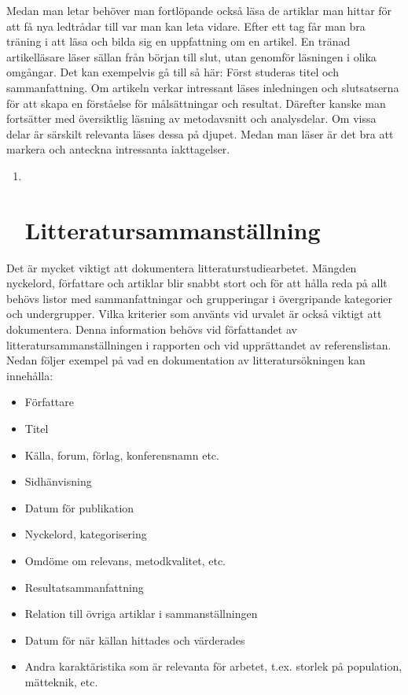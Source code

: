 \begin{itemize}
  Medan man letar behöver man fortlöpande också läsa de artiklar man
  hittar för att få nya ledtrådar till var man kan leta vidare. Efter
  ett tag får man bra träning i att läsa och bilda sig en uppfattning om
  en artikel. En tränad artikelläsare läser sällan från början till
  slut, utan genomför läsningen i olika omgångar. Det kan exempelvis gå
  till så här: Först studeras titel och sammanfattning. Om artikeln
  verkar intressant läses inledningen och slutsatserna för att skapa en
  förståelse för målsättningar och resultat. Därefter kanske man
  fortsätter med översiktlig läsning av metodavsnitt och analysdelar. Om
  vissa delar är särskilt relevanta läses dessa på djupet. Medan man
  läser är det bra att markera och anteckna intressanta iakttagelser.

  \begin{enumerate}
  \def\labelenumi{\arabic{enumi}.}
  \item ~
    \section{Litteratursammanställning}\label{litteratursammanstuxe4llning}
  \end{enumerate}
\end{itemize}

Det är mycket viktigt att dokumentera litteraturstudiearbetet. Mängden
nyckelord, författare och artiklar blir snabbt stort och för att hålla
reda på allt behövs listor med sammanfattningar och grupperingar i
övergripande kategorier och undergrupper. Vilka kriterier som använts
vid urvalet är också viktigt att dokumentera. Denna information behövs
vid författandet av litteratursammanställningen i rapporten och vid
upprättandet av referenslistan. Nedan följer exempel på vad en
dokumentation av litteratursökningen kan innehålla:

\begin{itemize}
\item
  Författare
\item
  Titel
\item
  Källa, forum, förlag, konferensnamn etc.
\item
  Sidhänvisning
\item
  Datum för publikation
\item
  Nyckelord, kategorisering
\item
  Omdöme om relevans, metodkvalitet, etc.
\item
  Resultatsammanfattning
\item
  Relation till övriga artiklar i sammanställningen
\item
  Datum för när källan hittades och värderades
\item
  Andra karaktäristika som är relevanta för arbetet, t.ex. storlek på
  population, mätteknik, etc.
\end{itemize}

